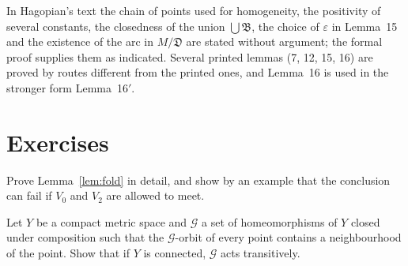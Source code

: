 
\begin{remark}
In Hagopian's text the chain of points used for homogeneity, the positivity of several constants, the closedness of the union
$\bigcup\mathfrak B$, the choice of $\varepsilon$ in Lemma~15 and the existence of the arc in $M/\mathfrak D$ are stated without argument;
the formal proof supplies them as indicated. Several printed lemmas (7, 12, 15, 16) are proved by routes different from the
printed ones, and Lemma~16 is used in the stronger form Lemma~16$'$.
\end{remark}

\section*{Exercises}

\begin{exercise}
Prove Lemma~\ref{lem:fold} in detail, and show by an example that the conclusion can fail if $V_0$ and $V_2$ are allowed to meet.
\end{exercise}

\begin{exercise}
Let $Y$ be a compact metric space and $\mathcal G$ a set of homeomorphisms of $Y$ closed under composition such that the $\mathcal
G$-orbit of every point contains a neighbourhood of the point. Show that if $Y$ is connected, $\mathcal G$ acts transitively.
\end{exercise}
